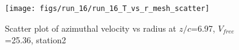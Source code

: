 \begin{figure}[H]
\centering
\texttt{[image: figs/run\_16/run\_16\_T\_vs\_r\_mesh\_scatter]}
\caption{Scatter plot of azimuthal velocity vs radius at $z/c$=6.97, $V_{free}$=25.36, station2}
\label{fig:run_16_T_vs_r_mesh_scatter}
\end{figure}


